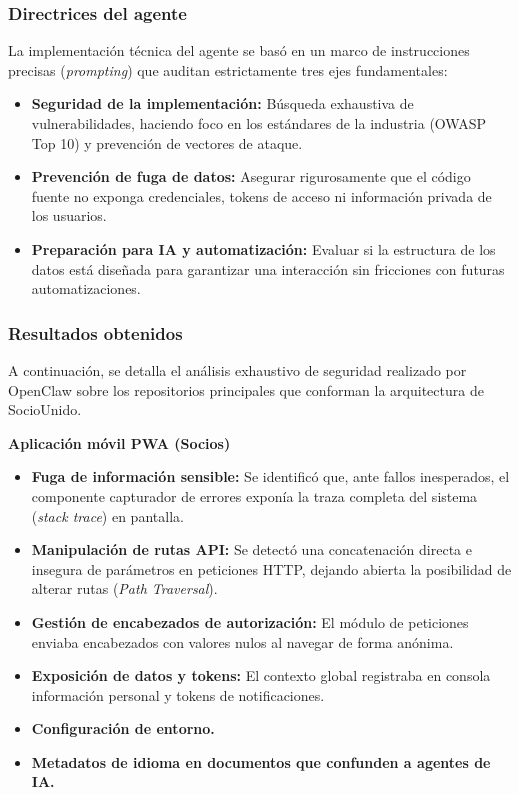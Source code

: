 \subsubsection{Directrices del agente}

La implementación técnica del agente se basó en un marco de instrucciones precisas (\textit{prompting}) que auditan estrictamente tres ejes fundamentales:
\begin{itemize}
    \item \textbf{Seguridad de la implementación:} Búsqueda exhaustiva de vulnerabilidades, haciendo foco en los estándares de la industria (OWASP Top 10) y prevención de vectores de ataque.
    \item \textbf{Prevención de fuga de datos:} Asegurar rigurosamente que el código fuente no exponga credenciales, tokens de acceso ni información privada de los usuarios.
    \item \textbf{Preparación para IA y automatización:} Evaluar si la estructura de los datos está diseñada para garantizar una interacción sin fricciones con futuras automatizaciones.
\end{itemize}

\subsubsection{Resultados obtenidos}

A continuación, se detalla el análisis exhaustivo de seguridad realizado por OpenClaw sobre los repositorios principales que conforman la arquitectura de SocioUnido.

\newpage

\noindent \textbf{Aplicación móvil PWA (Socios)}
\begin{itemize}
    \item \textbf{Fuga de información sensible:} Se identificó que, ante fallos inesperados, el componente capturador de errores exponía la traza completa del sistema (\textit{stack trace}) en pantalla.
    \item \textbf{Manipulación de rutas API:} Se detectó una concatenación directa e insegura de parámetros en peticiones HTTP, dejando abierta la posibilidad de alterar rutas (\textit{Path Traversal}).
    \item \textbf{Gestión de encabezados de autorización:} El módulo de peticiones enviaba encabezados con valores nulos al navegar de forma anónima.
    \item \textbf{Exposición de datos y tokens:} El contexto global registraba en consola información personal y tokens de notificaciones.
    \item \textbf{Configuración de entorno.}
    \item \textbf{Metadatos de idioma en documentos que confunden a agentes de IA.}
\end{itemize}

